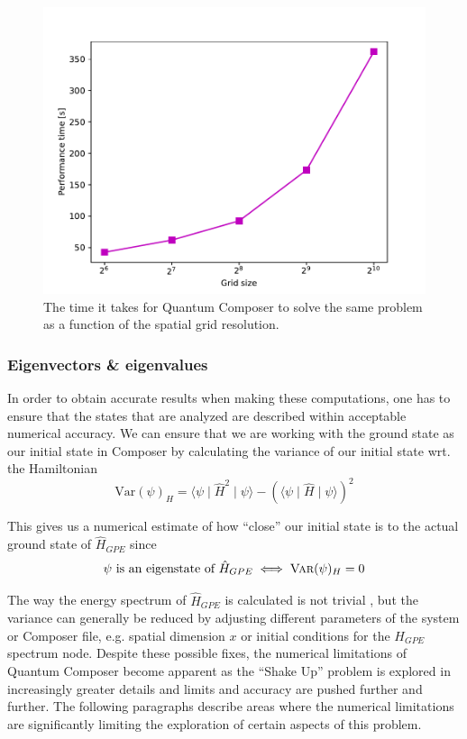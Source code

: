 \documentclass[a4paper, twocolumn]{revtex4-1}
\begin{document}
\begin{figure}
	\includegraphics[width=\columnwidth]{graphics/stateAnalysis/PerformanceTime.pdf}
	\caption{The time it takes for Quantum Composer to solve the same problem as a function of the spatial grid resolution.}
	\label{fig:performanceTime}
\end{figure}

\subsubsection{Eigenvectors \& eigenvalues}

In order to obtain accurate results when making these computations, one has to ensure that the states that are analyzed are described within acceptable numerical accuracy. We can ensure that we are working with the ground state as our initial state in Composer by calculating the variance of our initial state wrt. the Hamiltonian
\begin{equation}
	\text{Var}(\psi)_H = \langle \psi \mid \hat{H}^2 \mid \psi \rangle - \left(\langle \psi \mid \hat{H} \mid \psi \rangle\right)^2
\end{equation}

This gives us a numerical estimate of how ``close'' our initial state is to the actual ground state of $\hat{H}_{GPE}$ since
\begin{equation}
	\psi \text{ is an eigenstate of } \hat{H}_{GPE} \iff \textsc{Var}(\psi)_H = 0
\end{equation}

The way the energy spectrum of $\hat{H}_{GPE}$ is calculated is not trivial \cite{QEngine}, but the variance can generally be reduced by adjusting different parameters of the system or Composer file, e.g. spatial dimension $x$ or initial conditions for the $H_{GPE}$ spectrum node. Despite these possible fixes, the numerical limitations of Quantum Composer become apparent as the ``Shake Up'' problem is explored in increasingly greater details and limits and accuracy are pushed further and further. The following paragraphs describe areas where the numerical limitations are significantly limiting the exploration of certain aspects of this problem.\\
\end{document}

